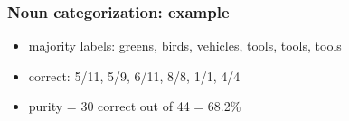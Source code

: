 \begin{frame}
\frametitle{Noun categorization: example}
\ungap[1]
\begin{center}
\end{center}
\ungap[1]
\begin{itemize}
\item<3-> majority labels: greens, birds, vehicles, tools, tools, tools
\item<3-> correct: 5/11, 5/9, 6/11, 8/8, 1/1, 4/4
\item<4-> purity = 30 correct out of 44 = 68.2\%
\end{itemize}

\end{frame}


